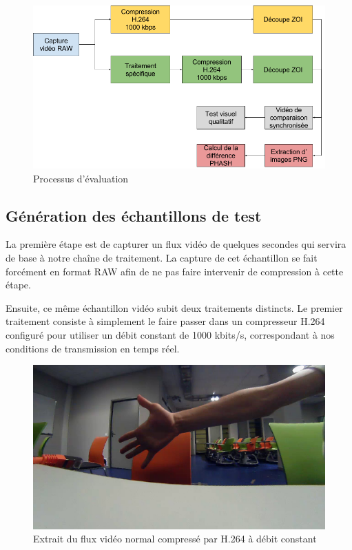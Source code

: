 \documentclass[11pt,a4paper]{article}
\begin{document}
\begin{figure}[H]
\begin{center}
\includegraphics[scale=0.4]{images/tests_schema.png}
\end{center}
\caption{Processus d'évaluation}
\label{}
\end{figure}

\subsection{Génération des échantillons de test}
La première étape est de capturer un flux vidéo de quelques secondes qui servira de base à notre chaîne de traitement.
La capture de cet échantillon se fait forcément en format RAW afin de ne pas faire intervenir de compression à cette étape.

\bigbreak
Ensuite, ce même échantillon vidéo subit deux traitements distincts.
Le premier traitement consiste à simplement le faire passer dans un compresseur H.264 configuré pour utiliser un débit constant de 1000 kbits/s, correspondant à nos conditions de transmission en temps réel.

\begin{figure}[H]
\begin{center}
\includegraphics[scale=0.25]{images/comparaison_flux1.png}
\end{center}
\caption{Extrait du flux vidéo normal compressé par H.264 à débit constant}
\label{}
\end{figure}
\end{document}
